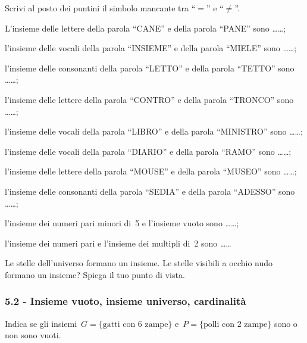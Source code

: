\begin{esercizio}
\label{ese:5.8}
Scrivi al posto dei puntini il simbolo mancante tra ``$=$'' e ``${\neq}$''.
\begin{enumeratea}
\item L'insieme delle lettere della parola ``CANE'' e della parola ``PANE'' sono \ldots\ldots;
\item l'insieme delle vocali della parola ``INSIEME'' e della parola ``MIELE'' sono \ldots\ldots;
\item l'insieme delle consonanti della parola ``LETTO'' e della parola ``TETTO'' sono \ldots\ldots;
\item l'insieme delle lettere della parola ``CONTRO'' e della parola ``TRONCO'' sono \ldots\ldots;
\item l'insieme delle vocali della parola ``LIBRO'' e della parola ``MINISTRO'' sono \ldots\ldots;
\item l'insieme delle vocali della parola ``DIARIO'' e della parola ``RAMO'' sono \ldots\ldots;
\item l'insieme delle lettere della parola ``MOUSE'' e della parola ``MUSEO'' sono \ldots\ldots;
\item l'insieme delle consonanti della parola ``SEDIA'' e della parola ``ADESSO'' sono \ldots\ldots;
\item l'insieme dei numeri pari minori di~5 e l'insieme vuoto sono \ldots\ldots;
\item l'insieme dei numeri pari e l'insieme dei multipli di~2 sono \ldots\ldots
\end{enumeratea}
\end{esercizio}

\begin{esercizio}
\label{ese:5.9}
Le stelle dell'universo formano un insieme. Le stelle visibili a occhio nudo formano un insieme? Spiega il tuo punto di vista.
\end{esercizio}

\subsubsection*{5.2 - Insieme vuoto, insieme universo, cardinalità}
\begin{esercizio}
\label{ese:5.10}
Indica se gli insiemi~$G =\{\text{gatti con~6 zampe}\}$ e~$P = \{\text{polli con~2 zampe}\}$ sono o non sono vuoti.
\end{esercizio}

